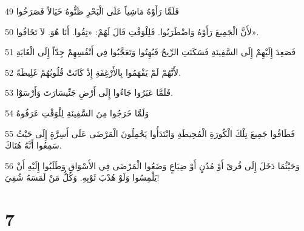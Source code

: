 \par 49 فَلَمَّا رَأَوْهُ مَاشِياً عَلَى الْبَحْرِ ظَنُّوهُ خَيَالاً فَصَرَخُوا
\par 50 لأَنَّ الْجَمِيعَ رَأَوْهُ وَاضْطَرَبُوا. فَلِلْوَقْتِ قَالَ لَهُمْ: «ثِقُوا. أَنَا هُوَ. لاَ تَخَافُوا».
\par 51 فَصَعِدَ إِلَيْهِمْ إِلَى السَّفِينَةِ فَسَكَنَتِ الرِّيحُ فَبُهِتُوا وَتَعَجَّبُوا فِي أَنْفُسِهِمْ جِدّاً إِلَى الْغَايَةِ
\par 52 لأَنَّهُمْ لَمْ يَفْهَمُوا بِالأَرْغِفَةِ إِذْ كَانَتْ قُلُوبُهُمْ غَلِيظَةً.
\par 53 فَلَمَّا عَبَرُوا جَاءُوا إِلَى أَرْضِ جَنِّيسَارَتَ وَأَرْسَوْا.
\par 54 وَلَمَّا خَرَجُوا مِنَ السَّفِينَةِ لِلْوَقْتِ عَرَفُوهُ
\par 55 فَطَافُوا جَمِيعَ تِلْكَ الْكُورَةِ الْمُحِيطَةِ وَابْتَدَأُوا يَحْمِلُونَ الْمَرْضَى عَلَى أَسِرَّةٍ إِلَى حَيْثُ سَمِعُوا أَنَّهُ هُنَاكَ.
\par 56 وَحَيْثُمَا دَخَلَ إِلَى قُرىً أَوْ مُدُنٍ أَوْ ضِيَاعٍ وَضَعُوا الْمَرْضَى فِي الأَسْوَاقِ وَطَلَبُوا إِلَيْهِ أَنْ يَلْمِسُوا وَلَوْ هُدْبَ ثَوْبِهِ. وَكُلُّ مَنْ لَمَسَهُ شُفِيَ!

\chapter{7}

